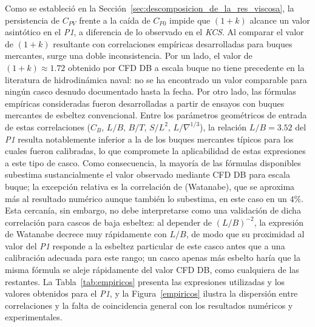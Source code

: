 Como se estableció en la Sección~\ref{sec:descomposicion_de_la_res_viscosa}, 
la persistencia de $C_{PV}$ frente a la caída de $C_{F0}$ impide que 
$(1+k)$ alcance un valor asintótico en el \textit{P1}, a diferencia de lo 
observado en el \textit{KCS}. Al comparar el valor de $(1+k)$ resultante con 
correlaciones empíricas desarrolladas para buques mercantes, surge una 
doble inconsistencia. Por un lado, el valor de $(1+k) \approx 1{.}72$ 
obtenido por CFD DB a escala buque no tiene precedente en la literatura 
de hidrodinámica naval: no se ha encontrado un valor comparable para 
ningún casco desnudo documentado hasta la fecha. Por otro lado, las 
fórmulas empíricas consideradas fueron desarrolladas a partir de ensayos 
con buques mercantes de esbeltez convencional. Entre los parámetros 
geométricos de entrada de estas correlaciones ($C_B$, $L/B$, $B/T$, 
$S/L^2$, $L/\nabla^{1/3}$), la relación $L/B = 3{.}52$ del \textit{P1} 
resulta notablemente inferior a la de los buques mercantes típicos para 
los cuales fueron calibradas, lo que compromete la aplicabilidad de estas 
expresiones a este tipo de casco. Como consecuencia, la mayoría de las 
fórmulas disponibles subestima sustancialmente el valor observado mediante 
CFD DB para escala buque; la excepción relativa es la correlación de 
\citet{molland2017ship} (Watanabe), que se aproxima más al resultado 
numérico aunque también lo subestima, en este caso en un $4\%$. Esta 
cercanía, sin embargo, no debe interpretarse como una validación de dicha 
correlación para cascos de baja esbeltez: al depender de $(L/B)^{-2}$, la 
expresión de Watanabe decrece muy rápidamente con $L/B$, de modo que su 
proximidad al valor del \textit{P1} responde a la esbeltez particular de 
este casco antes que a una calibración adecuada para este rango; un casco 
apenas más esbelto haría que la misma fórmula se aleje rápidamente del 
valor CFD DB, como cualquiera de las restantes. La Tabla~\ref{tab:empiricos} 
presenta las expresiones utilizadas y los valores obtenidos para el 
\textit{P1}, y la Figura~\ref{empiricos} ilustra la dispersión entre 
correlaciones y la falta de coincidencia general con los resultados 
numéricos y experimentales.
 
